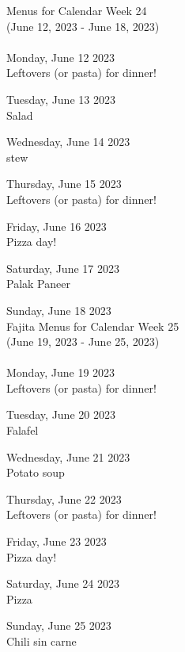 \documentclass[12pt, parskip=full*]{scrreprt}
\begin{document}
\begin{center}{\Large Menus for Calendar Week 24} \\ 
{\small (June 12, 2023 - June 18, 2023)}\\ 
 ~ \\{\calligra \Large Monday, June 12 2023} \\ 
Leftovers (or pasta) for dinner!

{\calligra \Large Tuesday, June 13 2023} \\ 
Salad

{\calligra \Large Wednesday, June 14 2023} \\ 
stew

{\calligra \Large Thursday, June 15 2023} \\ 
Leftovers (or pasta) for dinner!

{\calligra \Large Friday, June 16 2023} \\ 
Pizza day!

{\calligra \Large Saturday, June 17 2023} \\ 
Palak Paneer

{\calligra \Large Sunday, June 18 2023} \\ 
Fajita
\newpage
{\Large Menus for Calendar Week 25} \\ 
{\small (June 19, 2023 - June 25, 2023)}\\ 
 ~ \\{\calligra \Large Monday, June 19 2023} \\ 
Leftovers (or pasta) for dinner!

{\calligra \Large Tuesday, June 20 2023} \\ 
Falafel

{\calligra \Large Wednesday, June 21 2023} \\ 
Potato soup

{\calligra \Large Thursday, June 22 2023} \\ 
Leftovers (or pasta) for dinner!

{\calligra \Large Friday, June 23 2023} \\ 
Pizza day!

{\calligra \Large Saturday, June 24 2023} \\ 
Pizza

{\calligra \Large Sunday, June 25 2023} \\ 
Chili sin carne
\end{center}
\end{document}
